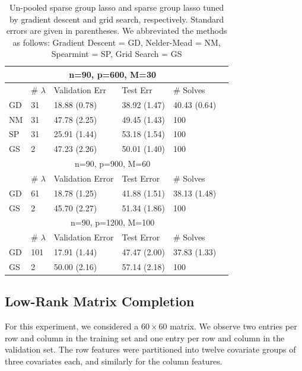 \documentclass[12pt]{article}
\begin{document}
\begin{table}
\caption{\label{table:unpooled} Un-pooled sparse group lasso and sparse group lasso tuned by gradient descent and grid search, respectively. Standard errors are given in parentheses. We abbreviated the methods as follows: Gradient Descent = GD, Nelder-Mead = NM, Spearmint = SP, Grid Search = GS}
\centering
\begin{tabular}{| l | l | l | l | l | l | }
\hline
\multicolumn{5}{|c|}{n=90, p=600, M=30}\\
\hline
& \# $\lambda$ & Validation Err & Test Err & \# Solves \\
\hline
GD & 31 & 18.88 (0.78) & 38.92 (1.47) & 40.43 (0.64) \\
\hline
NM & 31  & 47.78 (2.25) & 49.45 (1.43) & 100\\
\hline
SP & 31 &  25.91 (1.44) & 53.18 (1.54) & 100\\
\hline
GS & 2 & 47.23 (2.26) & 50.01 (1.40) & 100 \\
\hline
\multicolumn{5}{|c|}{n=90, p=900, M=60}\\
\hline
& \# $\lambda$ & Validation Error & Test Error & \# Solves \\
\hline
GD & 61 & 18.78 (1.25) & 41.88 (1.51) & 38.13 (1.48)\\
\hline
GS & 2 &  45.70 (2.27) & 51.34 (1.86) & 100 \\
\hline
\multicolumn{5}{|c|}{n=90, p=1200, M=100}\\
\hline
& \# $\lambda$ & Validation Error & Test Error & \# Solves \\
\hline
GD & 101 & 17.91 (1.44) & 47.47 (2.00) & 37.83 (1.33) \\
\hline
GS & 2 & 50.00 (2.16) & 57.14 (2.18) & 100 \\
\hline
\end{tabular}
\end{table}

\subsection{Low-Rank Matrix Completion}\label{sec:simulation_matrix}
For this experiment, we considered a $60 \times 60$ matrix. We observe two entries per row and column in the training set and one entry per row and column in the validation set. The row features were partitioned into twelve covariate groups of three covariates each, and similarly for the column features. 
\end{document}
